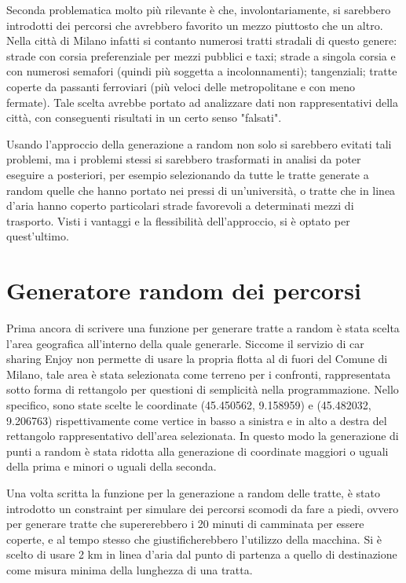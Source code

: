 Seconda problematica molto più rilevante è che, involontariamente, si sarebbero introdotti dei percorsi che avrebbero favorito un mezzo piuttosto che un altro. Nella città di Milano infatti si contanto numerosi tratti stradali di questo genere: strade con corsia preferenziale per mezzi pubblici e taxi; strade a singola corsia e con numerosi semafori (quindi più soggetta a incolonnamenti); tangenziali; tratte coperte da passanti ferroviari (più veloci delle metropolitane e con meno fermate). Tale scelta avrebbe portato ad analizzare dati non rappresentativi della città, con conseguenti risultati in un certo senso "falsati".

Usando l'approccio della generazione a random non solo si sarebbero evitati tali problemi, ma i problemi stessi si sarebbero trasformati in analisi da poter eseguire a posteriori, per esempio selezionando da tutte le tratte generate a random quelle che hanno portato nei pressi di un'università, o tratte che in linea d'aria hanno coperto particolari strade favorevoli a determinati mezzi di trasporto. Visti i vantaggi e la flessibilità dell'approccio, si è optato per quest'ultimo.

\section{Generatore random dei percorsi}

Prima ancora di scrivere una funzione per generare tratte a random è stata scelta l'area geografica all'interno della quale generarle. Siccome il servizio di car sharing Enjoy non permette di usare la propria flotta al di fuori del Comune di Milano, tale area è stata selezionata come terreno per i confronti, rappresentata sotto forma di rettangolo per questioni di semplicità nella programmazione. Nello specifico, sono state scelte le coordinate (45.450562\textdegree, 9.158959\textdegree) e (45.482032\textdegree, 9.206763\textdegree) rispettivamente come vertice in basso a sinistra e in alto a destra del rettangolo rappresentativo dell'area selezionata. In questo modo la generazione di punti a random è stata ridotta alla generazione di coordinate maggiori o uguali della prima e minori o uguali della seconda.

Una volta scritta la funzione per la generazione a random delle tratte, è stato introdotto un constraint per simulare dei percorsi scomodi da fare a piedi, ovvero per generare tratte che supererebbero i 20 minuti di camminata per essere coperte, e al tempo stesso che giustificherebbero l'utilizzo della macchina. Si è scelto di usare 2 km in linea d'aria dal punto di partenza a quello di destinazione come misura minima della lunghezza di una tratta.


